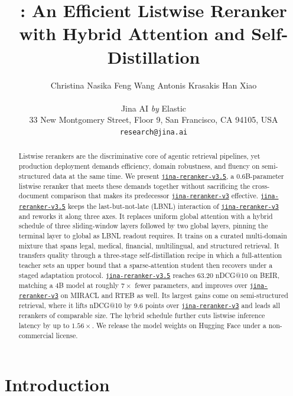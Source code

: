 \documentclass{article}
\title{\jrrvthreefive{}: An Efficient Listwise Reranker\\with Hybrid Attention and Self-Distillation}
\author{%
  Christina Nasika \quad
  Feng Wang \quad
  Antonis Krasakis \quad
  Han Xiao \\
  \\
  Jina AI \textit{by} Elastic \\
  33 New Montgomery Street, Floor 9, San Francisco, CA 94105, USA \\
  \texttt{research@jina.ai} \\
}
\newcommand{\jrrvthree}{\href{https://huggingface.co/jinaai/jina-reranker-v3}{\texttt{jina-reranker-v3}}}
\newcommand{\jrrvthreefive}{\href{https://huggingface.co/jinaai/jina-reranker-v3.5}{\texttt{jina-reranker-v3.5}}}
\begin{document}
\maketitle

\begin{abstract}
Listwise rerankers are the discriminative core of agentic retrieval pipelines, yet production deployment demands efficiency, domain robustness, and fluency on semi-structured data at the same time. We present \jrrvthreefive{}, a 0.6B-parameter listwise reranker that meets these demands together without sacrificing the cross-document comparison that makes its predecessor \jrrvthree{} effective. \jrrvthreefive{} keeps the last-but-not-late (LBNL) interaction of \jrrvthree{} and reworks it along three axes. It replaces uniform global attention with a hybrid schedule of three sliding-window layers followed by two global layers, pinning the terminal layer to global as LBNL readout requires. It trains on a curated multi-domain mixture that spans legal, medical, financial, multilingual, and structured retrieval. It transfers quality through a three-stage self-distillation recipe in which a full-attention teacher sets an upper bound that a sparse-attention student then recovers under a staged adaptation protocol. \jrrvthreefive{} reaches 63.20 nDCG@10 on BEIR, matching a 4B model at roughly $7\times$ fewer parameters, and improves over \jrrvthree{} on MIRACL and RTEB as well. Its largest gains come on semi-structured retrieval, where it lifts nDCG@10 by 9.6 points over \jrrvthree{} and leads all rerankers of comparable size. The hybrid schedule further cuts listwise inference latency by up to $1.56\times$. We release the model weights on Hugging Face under a non-commercial license.
\end{abstract}

\section{Introduction}
\label{sec:introduction}
\end{document}
